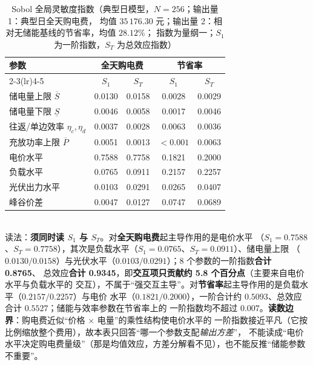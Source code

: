 \begin{table}[htbp]
  \centering
  \caption{Sobol 全局灵敏度指数（典型日模型，$N=256$；输出量 1：典型日全天购电费，
           均值 $35\,176.30$ 元；输出量 2：相对无储能基线的节省率，均值 $28.12\%$；
           指数为量纲一；$S_1$ 为一阶指数，$S_T$ 为总效应指数）}
  \label{tab:sobol-app}
  \footnotesize
  \setlength{\tabcolsep}{4pt}
  \begin{tabular}{lcccc}
    \toprule
    参数 & \multicolumn{2}{c}{全天购电费} & \multicolumn{2}{c}{节省率} \\
    \cmidrule(lr){2-3}\cmidrule(lr){4-5}
         & \(S_1\) & \(S_T\) & \(S_1\) & \(S_T\) \\
    \midrule
    储电量上限 \(\overline S\)        & 0.0130 & 0.0158 & 0.0028 & 0.0029 \\
    储电量下限 \(\underline S\)      & 0.0046 & 0.0058 & 0.0017 & 0.0046 \\
    往返/单边效率 \(\eta_c,\eta_d\)  & 0.0037 & 0.0028 & 0.0063 & 0.0036 \\
    充放功率上限 \(\overline P\)     & 0.0051 & 0.0013 & \(<0.001\) & 0.0063 \\
    电价水平                         & 0.7588 & 0.7758 & 0.1821 & 0.2000 \\
    负载水平                         & 0.0765 & 0.0911 & 0.2157 & 0.2257 \\
    光伏出力水平                     & 0.0103 & 0.0291 & 0.0265 & 0.0407 \\
    峰谷价差                         & 0.0047 & 0.0127 & 0.0747 & 0.0689 \\
    \bottomrule
  \end{tabular}
  \\[1ex]
  {\footnotesize 读法：\textbf{须同时读 $S_1$ 与 $S_T$}。对\textbf{全天购电费}起主导作用的是电价水平
   （\(S_1=0.7588\)、\(S_T=0.7758\)），其次是负载水平（\(S_1=0.0765\)、\(S_T=0.0911\)）、储电量上限
   （\(0.0130/0.0158\)）与光伏水平（\(0.0103/0.0291\)）；8 个参数的一阶指数\textbf{合计 0.8765}、
   总效应\textbf{合计 0.9345}，即\textbf{交互项只贡献约 5.8 个百分点}（主要来自电价水平与负载水平的
   交互），不属于“强交互主导”。对\textbf{节省率}起主导作用的是负载水平（\(0.2157/0.2257\)）与电价
   水平（\(0.1821/0.2000\)），一阶合计约 \(0.5093\)、总效应合计 \(0.5527\)；储能与效率参数在节省率上的
   一阶指数均不超过 \(0.007\)。\textbf{读数边界}：购电费近似“价格 \(\times\) 电量”的乘性结构使电价水平的
   一阶指数接近平凡（它按比例缩放整个费用），故本表只回答“哪一个参数支配\emph{输出方差}”，
   不能读成“电价水平决定购电费量级”（那是均值效应，方差分解看不见），也不能反推“储能参数不重要”。}
\end{table}

